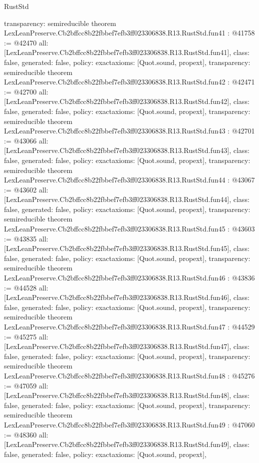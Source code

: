 \begin{lexlean}{RustStd}
\begin{coremodule}
{  transparency: semireducible
}
theorem LexLeanPreserve.Cb2bffcc8b22fbbef7efb3ff023306838.R13.RustStd.fun41 : @41758 := @42470 {
  all: [LexLeanPreserve.Cb2bffcc8b22fbbef7efb3ff023306838.R13.RustStd.fun41],
  class: false,
  generated: false,
  policy: exact{axioms: [Quot.sound, propext]},
  transparency: semireducible
}
theorem LexLeanPreserve.Cb2bffcc8b22fbbef7efb3ff023306838.R13.RustStd.fun42 : @42471 := @42700 {
  all: [LexLeanPreserve.Cb2bffcc8b22fbbef7efb3ff023306838.R13.RustStd.fun42],
  class: false,
  generated: false,
  policy: exact{axioms: [Quot.sound, propext]},
  transparency: semireducible
}
theorem LexLeanPreserve.Cb2bffcc8b22fbbef7efb3ff023306838.R13.RustStd.fun43 : @42701 := @43066 {
  all: [LexLeanPreserve.Cb2bffcc8b22fbbef7efb3ff023306838.R13.RustStd.fun43],
  class: false,
  generated: false,
  policy: exact{axioms: [Quot.sound, propext]},
  transparency: semireducible
}
theorem LexLeanPreserve.Cb2bffcc8b22fbbef7efb3ff023306838.R13.RustStd.fun44 : @43067 := @43602 {
  all: [LexLeanPreserve.Cb2bffcc8b22fbbef7efb3ff023306838.R13.RustStd.fun44],
  class: false,
  generated: false,
  policy: exact{axioms: [Quot.sound, propext]},
  transparency: semireducible
}
theorem LexLeanPreserve.Cb2bffcc8b22fbbef7efb3ff023306838.R13.RustStd.fun45 : @43603 := @43835 {
  all: [LexLeanPreserve.Cb2bffcc8b22fbbef7efb3ff023306838.R13.RustStd.fun45],
  class: false,
  generated: false,
  policy: exact{axioms: [Quot.sound, propext]},
  transparency: semireducible
}
theorem LexLeanPreserve.Cb2bffcc8b22fbbef7efb3ff023306838.R13.RustStd.fun46 : @43836 := @44528 {
  all: [LexLeanPreserve.Cb2bffcc8b22fbbef7efb3ff023306838.R13.RustStd.fun46],
  class: false,
  generated: false,
  policy: exact{axioms: [Quot.sound, propext]},
  transparency: semireducible
}
theorem LexLeanPreserve.Cb2bffcc8b22fbbef7efb3ff023306838.R13.RustStd.fun47 : @44529 := @45275 {
  all: [LexLeanPreserve.Cb2bffcc8b22fbbef7efb3ff023306838.R13.RustStd.fun47],
  class: false,
  generated: false,
  policy: exact{axioms: [Quot.sound, propext]},
  transparency: semireducible
}
theorem LexLeanPreserve.Cb2bffcc8b22fbbef7efb3ff023306838.R13.RustStd.fun48 : @45276 := @47059 {
  all: [LexLeanPreserve.Cb2bffcc8b22fbbef7efb3ff023306838.R13.RustStd.fun48],
  class: false,
  generated: false,
  policy: exact{axioms: [Quot.sound, propext]},
  transparency: semireducible
}
theorem LexLeanPreserve.Cb2bffcc8b22fbbef7efb3ff023306838.R13.RustStd.fun49 : @47060 := @48360 {
  all: [LexLeanPreserve.Cb2bffcc8b22fbbef7efb3ff023306838.R13.RustStd.fun49],
  class: false,
  generated: false,
  policy: exact{axioms: [Quot.sound, propext]},
}
\end{coremodule}
\end{lexlean}
